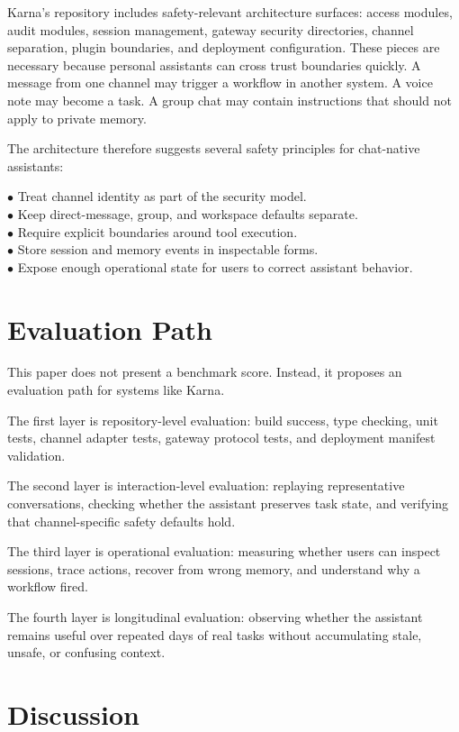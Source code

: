 \documentclass[11pt]{article}
\begin{document}
Karna’s repository includes safety-relevant architecture surfaces: access modules, audit modules, session management, gateway security directories, channel separation, plugin boundaries, and deployment configuration. These pieces are necessary because personal assistants can cross trust boundaries quickly. A message from one channel may trigger a workflow in another system. A voice note may become a task. A group chat may contain instructions that should not apply to private memory.

The architecture therefore suggests several safety principles for chat-native assistants:

\noindent $\bullet$ Treat channel identity as part of the security model.\\
\noindent $\bullet$ Keep direct-message, group, and workspace defaults separate.\\
\noindent $\bullet$ Require explicit boundaries around tool execution.\\
\noindent $\bullet$ Store session and memory events in inspectable forms.\\
\noindent $\bullet$ Expose enough operational state for users to correct assistant behavior.\\

\section{Evaluation Path}

This paper does not present a benchmark score. Instead, it proposes an evaluation path for systems like Karna.

The first layer is repository-level evaluation: build success, type checking, unit tests, channel adapter tests, gateway protocol tests, and deployment manifest validation.

The second layer is interaction-level evaluation: replaying representative conversations, checking whether the assistant preserves task state, and verifying that channel-specific safety defaults hold.

The third layer is operational evaluation: measuring whether users can inspect sessions, trace actions, recover from wrong memory, and understand why a workflow fired.

The fourth layer is longitudinal evaluation: observing whether the assistant remains useful over repeated days of real tasks without accumulating stale, unsafe, or confusing context.

\section{Discussion}
\end{document}
